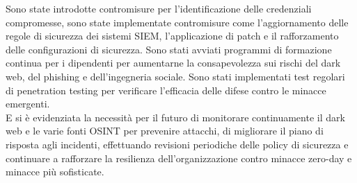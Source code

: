 Sono state introdotte contromisure per l'identificazione delle credenziali compromesse, sono state implementate contromisure come l'aggiornamento delle regole di sicurezza dei sistemi SIEM, l'applicazione di patch e il rafforzamento delle configurazioni di sicurezza.
Sono stati avviati programmi di formazione continua per i dipendenti per aumentarne la consapevolezza sui rischi del dark web, del phishing e dell'ingegneria sociale.
Sono stati implementati test regolari di penetration testing per verificare l'efficacia delle difese contro le minacce emergenti.\\

E si è evidenziata la necessità per il futuro di monitorare continuamente il dark web e le varie fonti OSINT per prevenire attacchi, di migliorare il piano di risposta agli incidenti, effettuando revisioni periodiche delle policy di sicurezza e continuare a rafforzare la resilienza dell'organizzazione contro minacce zero-day e minacce più sofisticate.